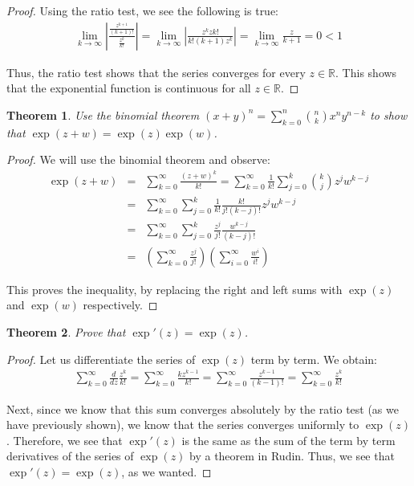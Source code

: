 \documentclass[psamsfonts]{amsart}
\newtheorem{thm}{Theorem}[section]
\theoremstyle{definition}
\theoremstyle{remark}
\numberwithin{equation}{section}
\begin{document}
\begin{proof}
Using the ratio test, we see the following is true:
\begin{eqnarray}
\lim_{k \to \infty} \left| \frac{ \frac{z^{k+1}}{(k+1)!}}{\frac{z^k}{k!}} \right| = \lim_{k \to \infty} \left| \frac{z^k z k!}{k! (k+1) z^k} \right| = \lim_{k \to \infty} \frac{z}{k+1} = 0 < 1
\end{eqnarray}

Thus, the ratio test shows that the series converges for every $z \in \mathbb{R}$. This shows that the exponential function is continuous for all $z \in \mathbb{R}$. 
\end{proof}

\begin{thm}
Use the binomial theorem  $(x+y)^n = \sum_{k=0}^n { n \choose k} x^n y^{n-k}$ to show that $\exp(z + w) = \exp(z) \exp(w)$. 
\end{thm}

\begin{proof}
We will use the binomial theorem and observe:
\begin{eqnarray}
\exp(z + w) &=& \sum_{k=0}^\infty \frac{(z+w)^k}{k!} = \sum_{k=0}^\infty \frac{1}{k!} \sum_{j=0}^k {k \choose j } z^j w^{k-j} \\
&=& \sum_{k=0}^\infty \sum_{j=0}^k \frac{1}{k!} \frac{ k!}{j! (k - j)!} z^{j} w^{k-j} \\
&=& \sum_{k=0}^\infty \sum_{j=0}^k \frac{z^j}{j!} \frac{w^{k-j}}{(k-j)!} \\
&=& \left( \sum_{k=0}^\infty \frac{z^j}{j!} \right) \left( \sum_{i=0}^\infty \frac{w^{i}}{i!} \right)
\end{eqnarray}

This proves the inequality, by replacing the right and left sums with $\exp(z)$ and $\exp(w)$ respectively.
\end{proof}

\begin{thm}
Prove that $\exp'(z) = \exp(z)$. 
\end{thm}

\begin{proof}
Let us differentiate the series of $\exp(z)$ term by term. We obtain:
\begin{eqnarray}
\sum_{k=0}^\infty \frac{d}{dz} \frac{z^k}{k!} = \sum_{k=0}^\infty \frac{k z^{k-1}}{k!} = \sum_{k=0}^\infty \frac{z^{k-1}}{(k-1)!} = \sum_{k=0}^\infty \frac{z^k}{k!}
\end{eqnarray}

Next, since we know that this sum converges absolutely by the ratio test (as we have previously shown), we know that the series converges uniformly to $\exp(z)$. Therefore, we see that $\exp'(z)$ is the same as the sum of the term by term derivatives of the series of $\exp(z)$ by a theorem in Rudin. Thus, we see that $\exp'(z) = \exp(z)$, as we wanted.
\end{proof}
\end{document}
